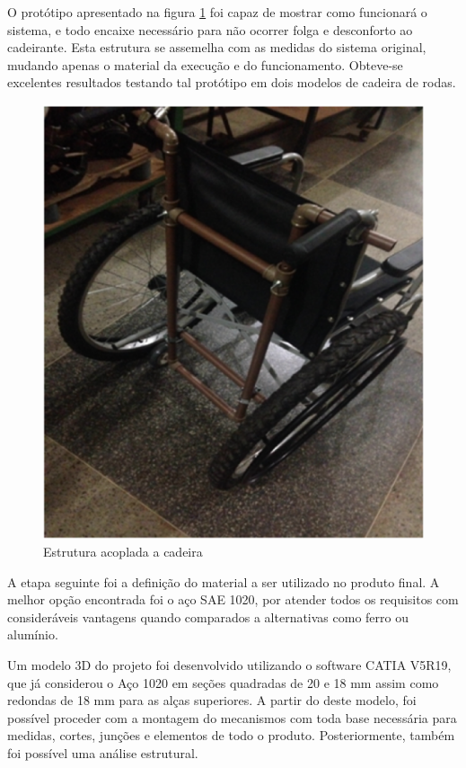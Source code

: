 O protótipo apresentado na figura \ref{fig:estr_prototipo} foi capaz de mostrar como funcionará o sistema, e todo encaixe necessário para não ocorrer folga e desconforto ao cadeirante. Esta estrutura se assemelha com as medidas do sistema original, mudando apenas o material da execução e do funcionamento. Obteve-se excelentes resultados testando tal protótipo em dois modelos de cadeira de rodas.

\begin{figure}[!htb]
\centering
\includegraphics[keepaspectratio=true,scale=0.7]{figuras/resultados/estr_prototipo}
\caption{Estrutura acoplada a cadeira}
\label{fig:estr_prototipo}
\end{figure}

A etapa seguinte foi a definição do material a ser utilizado no produto final. A melhor opção encontrada foi o aço SAE 1020, por atender todos os requisitos com consideráveis vantagens quando comparados a alternativas como ferro ou alumínio.

Um modelo 3D do projeto foi desenvolvido utilizando o software CATIA V5R19, que já considerou o Aço 1020 em seções quadradas de 20 e 18 mm assim como redondas de 18 mm para as alças superiores. A partir do deste modelo, foi possível proceder com a montagem do mecanismos com toda base necessária para medidas, cortes, junções e elementos de todo o produto. Posteriormente, também foi possível uma análise estrutural.


